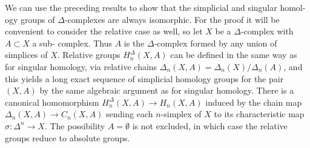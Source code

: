 We can use the preceding results to show that the simplicial and singular homol-
ogy groups of $\Delta$-complexes are always isomorphic. For the proof it will be convenient
to consider the relative case as well, so let $X$ be a $\Delta$-complex with $A \subset X$ a sub-
complex. Thus $A$ is the $\Delta$-complex formed by any union of simplices of $X$. Relative
groups $H_n^\Delta(X,A)$ can be defined in the same way as for singular homology, via relative
chains $\Delta_n(X,A) = \Delta_n(X)/\Delta_n(A)$, and this yields a long exact sequence of simplicial
homology groups for the pair $(X,A)$ by the same algebraic argument as for singular
homology. There is a canonical homomorphism $H_n^\Delta(X,A) \to H_n(X,A)$ induced by the
chain map $\Delta_n(X,A) \to C_n(X,A)$ sending each $n$-simplex of $X$ to its characteristic
map $\sigma: \Delta^n \to X$. The possibility $A = \emptyset$ is not excluded, in which case the relative
groups reduce to absolute groups.

